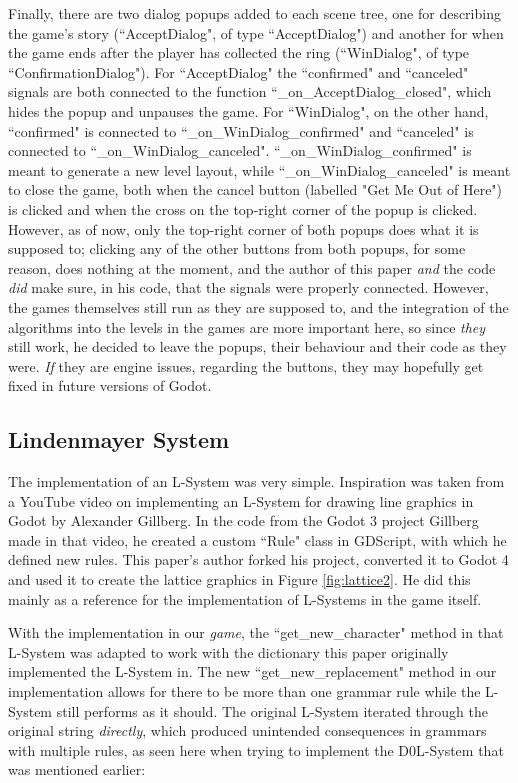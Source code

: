Finally, there are two dialog popups added to each scene tree, one for describing the game's story (``AcceptDialog", of type ``AcceptDialog") and another for when the game ends after the player has collected the ring (``WinDialog", of type ``ConfirmationDialog"). For ``AcceptDialog" the ``confirmed" and ``canceled" signals are both connected to the function ``\_on\_AcceptDialog\_closed", which hides the popup and unpauses the game. For ``WinDialog", on the other hand, ``confirmed" is connected to ``\_on\_WinDialog\_confirmed" and ``canceled" is connected to ``\_on\_WinDialog\_canceled". ``\_on\_WinDialog\_confirmed" is meant to generate a new level layout, while ``\_on\_WinDialog\_canceled" is meant to close the game, both when the cancel button (labelled "Get Me Out of Here") is clicked and when the cross on the top-right corner of the popup is clicked. However, as of now, only the top-right corner of both popups does what it is supposed to; clicking any of the other buttons from both popups, for some reason, does nothing at the moment, and the author of this paper \emph{and} the code \textit{did} make sure, in his code, that the signals were properly connected. However, the games themselves still run as they are supposed to, and the integration of the algorithms into the levels in the games are more important here, so since \textit{they} still work, he decided to leave the popups, their behaviour and their code as they were. \textit{If} they are engine issues, regarding the buttons, they may hopefully get fixed in future versions of Godot.

\subsection{Lindenmayer System} \label{implsys1}

The implementation of an L-System was very simple. Inspiration was taken from a YouTube video on implementing an L-System for drawing line graphics in Godot by Alexander Gillberg.\cite{codatGD3LSystemYT} In the code from the Godot 3 project Gillberg made in that video\cite{codatGD3LSystemGH}\cite{codatGD3LSystemYT}, he created a custom ``Rule" class in GDScript, with which he defined new rules. This paper's author forked his project, converted it to Godot 4 and used it to create the lattice graphics in Figure \ref{fig:lattice2}.\cite{codatGD4LSystemGH} He did this mainly as a reference for the implementation of L-Systems in the game itself.

With the implementation in our \emph{game}, the ``get\_new\_character" method in that L-System was adapted to work with the dictionary this paper originally implemented the L-System in. The new ``get\_new\_replacement" method in our implementation allows for there to be more than one grammar rule while the L-System still performs as it should. The original L-System iterated through the original string \textit{directly}, which produced unintended consequences in grammars with multiple rules, as seen here when trying to implement the D0L-System that was mentioned earlier\cite{lsystemintro}:

